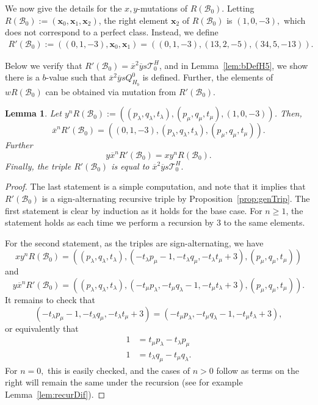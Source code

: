 \documentclass[11pt, reqno]{amsart}
\newtheorem{lemma}[thm]{Lemma}
\theoremstyle{remark}
\numberwithin{equation}{subsection}
\numberwithin{figure}{section}
\theoremstyle{customremark}
\newcommand{\Tt}{\mathcal{T}}
\newcommand{\ov}{\overline}
\newcommand{\la}{{\lambda}}
\begin{document}
We now give the details for the $x,y$-mutations of $R(\mathcal{B}_0).$ Letting
$R(\mathcal{B}_0):=(\bm{x}_0,\bm{x}_1,\bm{x}_2)$, the right element $\bm{x}_2$ of $R(\mathcal{B}_0)$ is $(1,0,-3),$ which does not correspond to a perfect class. Instead, we define \begin{align*} R'(\mathcal{B}_0):=((0,1,-3),\bm{x}_0,\bm{x}_1)=\left((0,1,-3),(13,2,-5),(34,5,-13)\right).\end{align*}

Below we verify that $R'(\mathcal{B}_0)=\ov{x}^2\ov{y}s\Tt_0^H$, and in Lemma~\ref{lem:bDefH5}, we show there is a $b$-value such that $\ov{x}^2\ov{y}sQ_{H_b}^0$ is defined. Further, the elements of $wR(\mathcal{B}_0)$ can be obtained via mutation from $R'(\mathcal{B}_0).$ 

\begin{lemma} \label{lem:R'andR}
Let $y^nR(\mathcal{B}_0):=\left((p_\la,q_\la,t_\la),(p_\mu,q_\mu,t_\mu),(1,0,-3)\right)$. Then, 
\[ \ov{x}^nR'(\mathcal{B}_0)=\left((0,1,-3),(p_\la,q_\la,t_\la),(p_\mu,q_\mu,t_\mu)\right).\]
Further
\[ y\ov{x}^nR'(\mathcal{B}_0)=xy^nR(\mathcal{B}_0).\]
Finally, the triple $R'(\mathcal{B}_0)$ is equal to $\ov{x}^2\ov{y}s\Tt_0^H.$ 

\end{lemma}
\begin{proof}
    The last statement is a simple computation, and note that it implies that $R'(\mathcal{B}_0)$ is a sign-alternating recursive triple by Proposition~\ref{prop:genTrip}. 
    The first statement is clear by induction as it holds for the base case. For $n \geq 1$, the statement holds as each time we perform a recursion by $3$ to the same elements. 

    For the second statement, as the triples are sign-alternating, we have 
    \[ xy^nR(\mathcal{B}_0)=((p_\la,q_\la,t_\la),(-t_\la p_\mu-1,-t_\la q_\mu,-t_\la t_\mu+3),(p_\mu,q_\mu,t_\mu))\]
    and
    \[y\ov{x}^nR'(\mathcal{B}_0)=((p_\la,q_\la,t_\la),(-t_\mu p_\la,-t_\mu q_\la-1,-t_\mu t_\la+3),(p_\mu,q_\mu,t_\mu)).\]
    It remains to check that
    \[ (-t_\la p_\mu-1,-t_\la q_\mu,-t_\la t_\mu+3)=(-t_\mu p_\la,-t_\mu q_\la-1,-t_\mu t_\la+3),\]
    or equivalently that
    \begin{align*}
        1&=t_\mu p_\la-t_\la p_\mu \\
        1&=t_\la q_\mu-t_\mu q_\la.  
    \end{align*}
    For $n=0,$ this is easily checked, and the cases of $n>0$ follow as terms on the right will remain the same under the recursion (see for example Lemma~\ref{lem:recurDif}). 
\end{proof}
\end{document}
